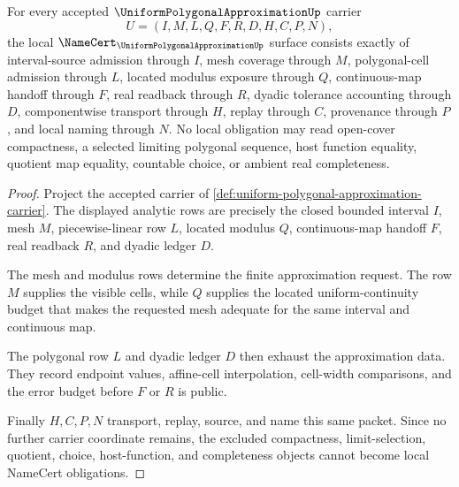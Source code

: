 \begin{theorem}
\label{thm:uniform-polygonal-approximation-namecert-obligations}
For every accepted $\UniformPolygonalApproximationUp$ carrier
$$
U=(I,M,L,Q,F,R,D,H,C,P,N),
$$
the local $\NameCert_{\UniformPolygonalApproximationUp}$ surface consists exactly of interval-source admission through $I$, mesh coverage through $M$, polygonal-cell admission through $L$, located modulus exposure through $Q$, continuous-map handoff through $F$, real readback through $R$, dyadic tolerance accounting through $D$, componentwise transport through $H$, replay through $C$, provenance through $P$, and local naming through $N$. No local obligation may read open-cover compactness, a selected limiting polygonal sequence, host function equality, quotient map equality, countable choice, or ambient real completeness.
\end{theorem}
\begin{proof}
Project the accepted carrier of \autoref{def:uniform-polygonal-approximation-carrier}. The displayed analytic rows are precisely the closed bounded interval $I$, mesh $M$, piecewise-linear row $L$, located modulus $Q$, continuous-map handoff $F$, real readback $R$, and dyadic ledger $D$.

The mesh and modulus rows determine the finite approximation request. The row $M$ supplies the visible cells, while $Q$ supplies the located uniform-continuity budget that makes the requested mesh adequate for the same interval and continuous map.

The polygonal row $L$ and dyadic ledger $D$ then exhaust the approximation data. They record endpoint values, affine-cell interpolation, cell-width comparisons, and the error budget before $F$ or $R$ is public.

Finally $H,C,P,N$ transport, replay, source, and name this same packet. Since no further carrier coordinate remains, the excluded compactness, limit-selection, quotient, choice, host-function, and completeness objects cannot become local NameCert obligations.
\end{proof}

